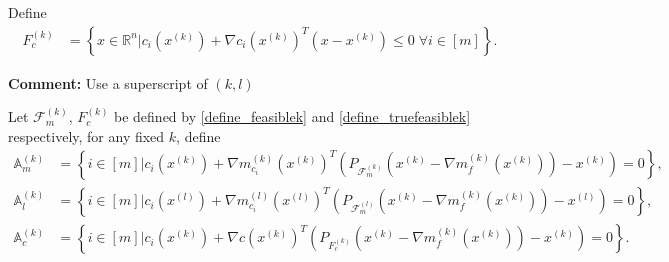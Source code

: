 \documentclass{article}
\newenvironment{comment}
  {\par\medskip
   \color{red}%
   \begin{framed}
   \textbf{Comment: }\ignorespaces}
 {\end{framed}
  \medskip}
\newtheorem{lemma}[theorem]{Lemma}
\theoremstyle{case}
\numberwithin{theorem}{subsection}
\newcommand{\feasiblek}{{\mathcal F_m^{(k)}}}
\newcommand{\feasiblel}{{\mathcal F_m^{(l)}}}
\newcommand{\gk}{{\nabla m_f^{(k)}\left(\xk\right)}}
\newcommand{\gmcik}{{\nabla m_{c_i}^{(k)}\left(\xk\right)}}
\newcommand{\gmcil}{{\nabla m_{c_i}^{(l)}\left(\xl\right)}}
\newcommand{\Rn}{\mathbb R^n}
\newcommand{\xk}{x^{(k)}}
\newcommand{\xl}{{x^{(l)}}}
\newcommand{\truefeasiblek}{{F_c^{(k)}}}
\newcommand{\Amk}{{\mathbb A_m^{(k)}}}
\newcommand{\Alk}{{\mathbb A_l^{(k)}}}
\newcommand{\Ack}{{\mathbb A_c^{(k)}}}
\begin{document}
% 
% 
% 
% 
% 
% 
% 



Define
\begin{align}
\truefeasiblek &= \left\{ x \in \Rn \bigg| c_i\left(\xk\right) + \nabla c_i\left(\xk\right)^T \left(x - \xk\right) \le 0 \; \forall i \in [m] \right\}. \label{define_truefeasiblek}
\end{align}

\begin{comment}
Use a superscript of $(k, l)$
\end{comment}



Let $\feasiblek$, $\truefeasiblek$ be defined by \cref{define_feasiblek} and \cref{define_truefeasiblek} respectively, for any fixed $k$, define
\begin{align}
\Amk &= \left\{ i \in [m] \bigg | c_i\left(\xk\right) + \gmcik^T\left( P_{\feasiblek}\left(\xk - \gk\right) - \xk\right) = 0\right\}, \label{tbbt_a1} \\
\Alk &= \left\{ i \in [m] \bigg | c_i\left(\xl\right) + \gmcil^T\left( P_{\feasiblel}\left(\xk - \gk\right) - \xl\right) = 0\right\}, \label{tbbt_a2} \\
\Ack &= \left\{ i \in [m] \bigg | c_i\left(\xk\right) + \nabla c\left(\xk\right)^T\left( P_{\truefeasiblek}\left(\xk - \gk\right) - \xk\right) = 0\right\}. \label{tbbt_a3}
\end{align}
\end{document}
